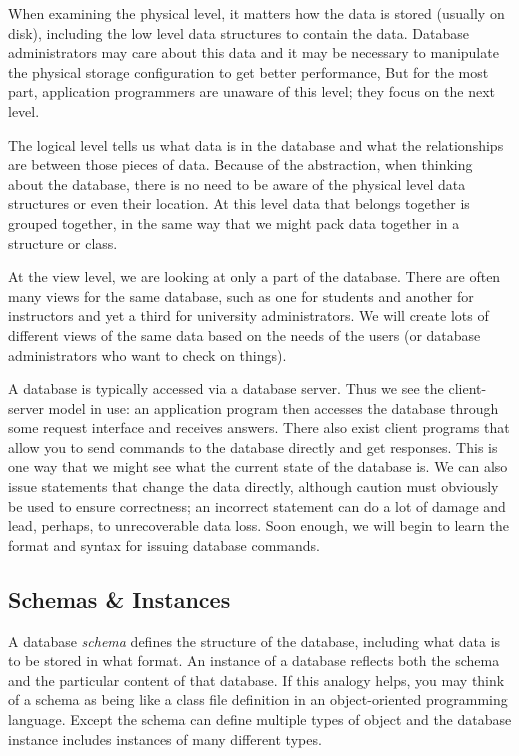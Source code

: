 When examining the physical level, it matters how the data is stored (usually on disk), including the low level data structures to contain the data. Database administrators may care about this data and it may be necessary to manipulate the physical storage configuration to get better performance, But for the most part, application programmers are unaware of this level; they focus on the next level.

The logical level tells us what data is in the database and what the relationships are between those pieces of data. Because of the abstraction, when thinking about the database, there is no need to be aware of the physical level data structures or even their location. At this level data that belongs together is grouped together, in the same way that we might pack data together in a structure or class.

At the view level, we are looking at only a part of the database. There are often many views for the same database, such as one for students and another for instructors and yet a third for university administrators. We will create lots of different views of the same data based on the needs of the users (or database administrators who want to check on things).

A database is typically accessed via a database server. Thus we see the client-server model in use: an application program then accesses the database through some request interface and receives answers. There also exist client programs that allow you to send commands to the database directly and get responses. This is one way that we might see what the current state of the database is. We can also issue statements that change the data directly, although caution must obviously be used to ensure correctness; an incorrect statement can do a lot of damage and lead, perhaps, to unrecoverable data loss. Soon enough, we will begin to learn the format and syntax for issuing database commands.


\subsection*{Schemas \& Instances}

A database \textit{schema} defines the structure of the database, including what data is  to be stored in what format. An instance of a database reflects both the schema and the particular content of that database. If this analogy helps, you may think of a schema as being like a class file definition in an object-oriented programming language. Except the schema can define multiple types of object and the database instance includes instances of many different types.

